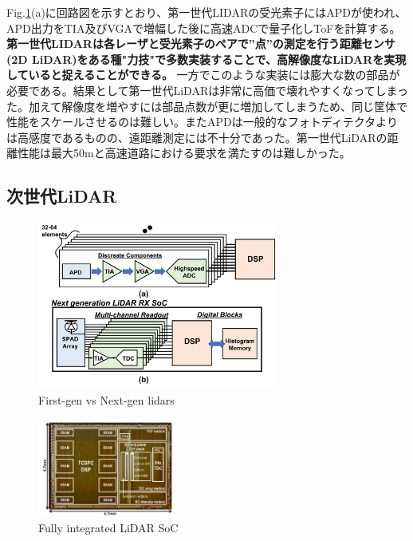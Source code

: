 \documentclass[twocolumn, 11pt, a4j]{article}
\begin{document}
Fig.\ref{next}(a)に回路図を示すとおり、第一世代LIDARの受光素子にはAPDが使われ、APD出力をTIA及びVGAで増幅した後に高速ADCで量子化しToFを計算する。
\textbf{第一世代LIDARは各レーザと受光素子のペアで”点”の測定を行う距離センサ(2D LiDAR)をある種"力技"で多数実装することで、高解像度なLiDARを実現していると捉えることができる。}
一方でこのような実装には膨大な数の部品が必要である。結果として第一世代LiDARは非常に高価で壊れやすくなってしまった。加えて解像度を増やすには部品点数が更に増加してしまうため、同じ筐体で性能をスケールさせるのは難しい。またAPDは一般的なフォトディテクタよりは高感度であるものの、遠距離測定には不十分であった。第一世代LiDARの距離性能は最大50mと高速道路における要求を満たすのは難しかった。

\subsection{次世代LiDAR}
\begin{figure}[!t]
\centering
 \includegraphics[width=0.7\textwidth]{figs/nextlidar.png}
  \caption{First-gen vs Next-gen lidars}
\label{next}
\end{figure}

\begin{figure}[!t]
\centering
 \includegraphics[width=0.4\textwidth]{figs/niclasschip.png}
  \caption{Fully integrated LiDAR SoC \cite{niclass2012100}}
\label{chip}
\end{figure}
\end{document}
